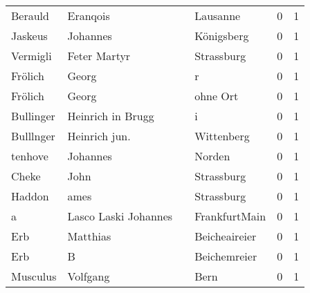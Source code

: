 \begin{tabular}{llllrr}
                  Berauld &                           Eranqois &             &                                    Lausanne &          0 &         1 \\
                  Jaskeus &                           Johannes &             &                                  Königsberg &          0 &         1 \\
                 Vermigli &                       Feter Martyr &             &                                  Strassburg &          0 &         1 \\
                  Frölich &                              Georg &             &                                           r &          0 &         1 \\
                  Frölich &                              Georg &             &                                    ohne Ort &          0 &         1 \\
                Bullinger &                  Heinrich in Brugg &             &                                           i &          0 &         1 \\
                Bulllnger &                      Heinrich jun. &             &                                  Wittenberg &          0 &         1 \\
                  tenhove &                           Johannes &             &                                      Norden &          0 &         1 \\
                    Cheke &                               John &             &                                  Strassburg &          0 &         1 \\
                   Haddon &                               ames &             &                                  Strassburg &          0 &         1 \\
                        a &               Lasco Laski Johannes &             &                               FrankfurtMain &          0 &         1 \\
                      Erb &                           Matthias &             &                               Beicheaireier &          0 &         1 \\
                      Erb &                                  B &             &                                Beichemreier &          0 &         1 \\
                 Musculus &                           Volfgang &             &                                        Bern &          0 &         1 \\

\end{tabular}
